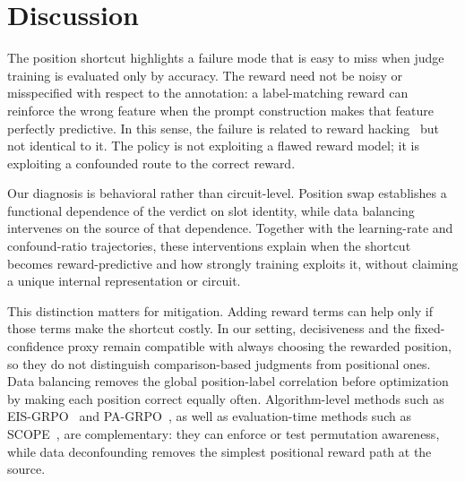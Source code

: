 \documentclass[11pt]{article}
\begin{document}
\begin{table}[H]
\centering
\scriptsize
\setlength{\tabcolsep}{2.5pt}
\caption{External check on public RL-trained judges. Both checkpoints show an original/swap accuracy gap and positive first-position bias among \mbox{inconsistent predictions}.}
\label{tab:judgelrm}
\end{table}

\section{Discussion}
\label{sec:discussion}

The position shortcut highlights a failure mode that is easy to miss when judge training is evaluated only by accuracy. The reward need not be noisy or misspecified with respect to the annotation: a label-matching reward can reinforce the wrong feature when the prompt construction makes that feature perfectly predictive. In this sense, the failure is related to reward hacking~\citep{skalse2022defining,gao2023scaling} but not identical to it. The policy is not exploiting a flawed reward model; it is exploiting a confounded route to the correct reward.

Our diagnosis is behavioral rather than circuit-level. Position swap establishes a functional dependence of the verdict on slot identity, while data balancing intervenes on the source of that dependence. Together with the learning-rate and confound-ratio trajectories, these interventions explain when the shortcut becomes reward-predictive and how strongly training exploits it, without claiming a unique internal representation or circuit.

This distinction matters for mitigation. Adding reward terms can help only if those terms make the shortcut costly. In our setting, decisiveness and the fixed-confidence proxy remain compatible with always choosing the rewarded position, so they do not distinguish comparison-based judgments from positional ones. Data balancing removes the global position-label correlation before optimization by making each position correct equally often. Algorithm-level methods such as EIS-GRPO~\citep{eisgrpo2026} and PA-GRPO~\citep{pagrpo2026}, as well as evaluation-time methods such as SCOPE~\citep{scope2026}, are complementary: they can enforce or test permutation awareness, while data deconfounding removes the simplest positional reward path at the source.
\end{document}
